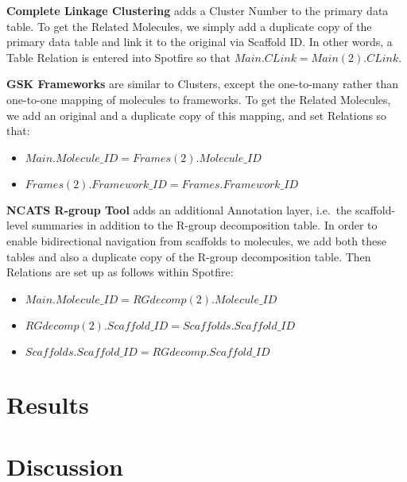 \documentclass[journal=jacsat,manuscript=article]{achemso}
\newcommand*\ie{i.e.~}
\begin{document}
{\bf Complete Linkage Clustering} adds a Cluster Number to the primary data table. To get the Related Molecules, we simply add a duplicate copy of the primary data table and link it to the original via Scaffold ID. In other words, a Table Relation is entered into Spotfire so that $Main.CLink = Main(2).CLink$.  

{\bf GSK Frameworks} are similar to Clusters, except the one-to-many rather than one-to-one mapping of molecules to frameworks. To get the Related Molecules, we add an original and a duplicate copy of this mapping, and set Relations so that:  
\begin{itemize}
\item $Main.Molecule\_ID = Frames(2).Molecule\_ID$
\item $Frames(2).Framework\_ID = Frames.Framework\_ID$
\end{itemize}

{\bf NCATS R-group Tool} adds an additional Annotation layer, \ie the scaffold-level summaries in addition to the R-group decomposition table. In order to enable bidirectional navigation from scaffolds to molecules, we add both these tables and also a duplicate copy of the R-group decomposition table. Then Relations are set up as follows within Spotfire:
\begin{itemize}
\item $Main.Molecule\_ID = RGdecomp(2).Molecule\_ID$
\item $RGdecomp(2).Scaffold\_ID = Scaffolds.Scaffold\_ID$
\item $Scaffolds.Scaffold\_ID = RGdecomp.Scaffold\_ID$
\end{itemize}   



\section{Results}

\section{Discussion}
\label{sec:discussion}
\end{document}
